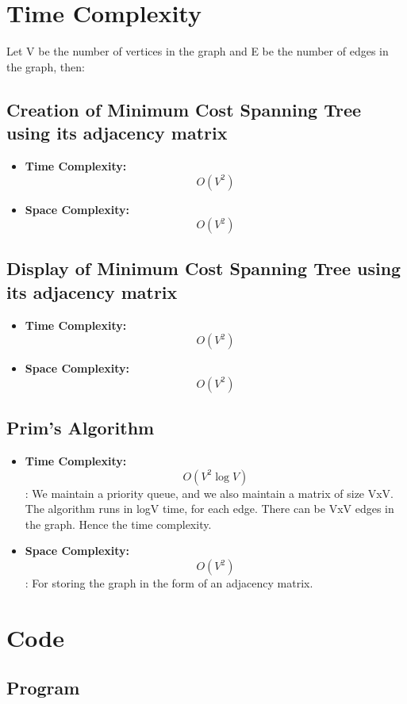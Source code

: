 \documentclass[11pt]{article}
\begin{document}
\section{Time Complexity}
Let V be the number of vertices in the graph and E be the number of edges in the graph, then:


\subsection{Creation of Minimum Cost Spanning Tree using its adjacency matrix}
\begin{itemize}
    \item \textbf{Time Complexity:} \[O(V^2)\]
    \item \textbf{Space Complexity:} \[O(V^2)\]
\end{itemize}

\subsection{Display of Minimum Cost Spanning Tree using its adjacency matrix}

\begin{itemize}
    \item \textbf{Time Complexity:} \[O(V^2)\]
    \item \textbf{Space Complexity:} \[O(V^2)\]
\end{itemize}

\subsection{Prim's Algorithm}

\begin{itemize}
    \item \textbf{Time Complexity:} \[O(V^2 \log V)\]: We maintain a priority queue, and we also maintain a matrix of size VxV. The algorithm runs in logV time, for each edge. There can be VxV edges in the graph. Hence the time complexity.
    \item \textbf{Space Complexity:} \[O(V^2)\]: For storing the graph in the form of an adjacency matrix.
\end{itemize}

\section{Code}

\subsection{Program}

\end{document}
